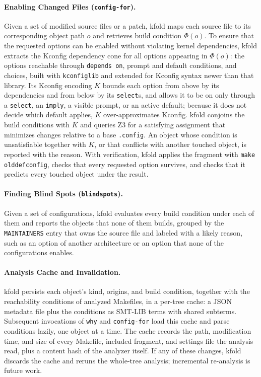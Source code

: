 \documentclass[acmsmall]{acmart}
\newcommand{\tool}{\textsf{kfold}\xspace}
\newcounter{none}
\begin{document}
\paragraph{Enabling Changed Files (\texttt{config-for}).}
Given a set of modified source files or a patch, \tool maps each source file to its corresponding object path $o$ and retrieves build condition $\Phi(o)$.
To ensure that the requested options can be enabled without violating kernel dependencies, \tool extracts the Kconfig dependency cone for all options appearing in $\Phi(o)$: the options reachable through \texttt{depends on}, prompt and default conditions, and choices, built with \texttt{kconfiglib} and extended for Kconfig syntax newer than that library.
Its Kconfig encoding $K$ bounds each option from above by its dependencies and from below by its \texttt{select}s, and allows it to be on only through a \texttt{select}, an \texttt{imply}, a visible prompt, or an active default; because it does not decide which default applies, $K$ over-approximates Kconfig.
\tool conjoins the build conditions with $K$ and queries Z3 for a satisfying assignment that minimizes changes relative to a base \texttt{.config}.
An object whose condition is unsatisfiable together with $K$, or that conflicts with another touched object, is reported with the reason.
With verification, \tool applies the fragment with \texttt{make olddefconfig}, checks that every requested option survives, and checks that it predicts every touched object under the result.

\paragraph{Finding Blind Spots (\texttt{blindspots}).}
Given a set of configurations, \tool evaluates every build condition under each of them and reports the objects that none of them builds, grouped by the \texttt{MAINTAINERS} entry that owns the source file and labeled with a likely reason, such as an option of another architecture or an option that none of the configurations enables.

\paragraph{Analysis Cache and Invalidation.}
\tool persists each object's kind, origins, and build condition, together with the reachability conditions of analyzed Makefiles, in a per-tree cache: a JSON metadata file plus the conditions as SMT-LIB terms with shared subterms.
Subsequent invocations of \texttt{why} and \texttt{config-for} load this cache and parse conditions lazily, one object at a time.
The cache records the path, modification time, and size of every Makefile, included fragment, and settings file the analysis read, plus a content hash of the analyzer itself.
If any of these changes, \tool discards the cache and reruns the whole-tree analysis; incremental re-analysis is future work.
\end{document}
